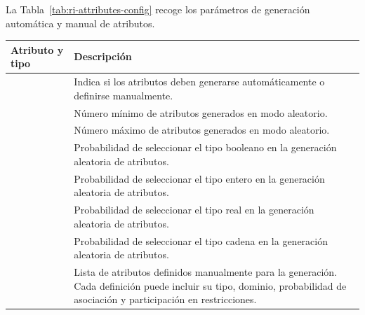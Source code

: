 La Tabla~\ref{tab:ri-attributes-config} recoge los parámetros de generación automática y manual de atributos.

\begin{longtable}{@{}P{5.3cm} P{\dimexpr\textwidth-5.3cm-2\tabcolsep\relax}@{}}
\toprule
\textbf{Atributo y tipo} & \textbf{Descripción} \\
\midrule
\endhead

 & Indica si los atributos deben generarse automáticamente o definirse manualmente. \\

\midrule
{} & Número mínimo de atributos generados en modo aleatorio. \\

\midrule
{} & Número máximo de atributos generados en modo aleatorio. \\

\midrule
{} & Probabilidad de seleccionar el tipo booleano en la generación
aleatoria de atributos. \\

\midrule
{} & Probabilidad de seleccionar el tipo entero en la generación
aleatoria de atributos. \\

\midrule
{} & Probabilidad de seleccionar el tipo real en la generación
aleatoria de atributos. \\

\midrule
{} & Probabilidad de seleccionar el tipo cadena en la generación
aleatoria de atributos. \\

\midrule
{} & Lista de atributos definidos manualmente para la generación. Cada
definición puede incluir su tipo, dominio, probabilidad de asociación y
participación en restricciones. \\


\end{longtable}
